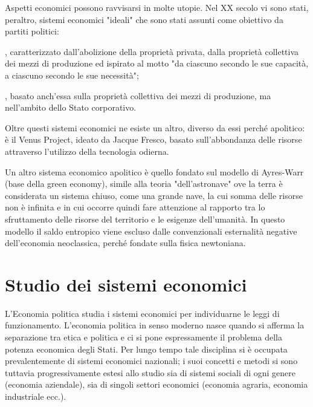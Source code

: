 Aspetti economici possono ravvisarsi in molte utopie. Nel XX secolo 
vi sono stati, peraltro, sistemi economici "ideali" che sono stati assunti come 
obiettivo da partiti politici:
\begin{description} [noitemsep]
\item [il comunismo], caratterizzato dall'abolizione della proprietà privata, 
dalla proprietà collettiva dei mezzi di produzione ed ispirato al motto "da 
ciascuno secondo le sue capacità, a ciascuno secondo le sue necessità";
\item [il fascismo], basato anch'essa sulla proprietà collettiva dei mezzi di 
produzione, ma nell'ambito dello Stato corporativo.
\end{description}

Oltre questi sistemi economici ne esiste un altro, diverso da essi perché 
apolitico: è il Venus Project, ideato da Jacque 
Fresco, basato sull'abbondanza delle risorse attraverso l'utilizzo della 
tecnologia odierna.

Un altro sistema economico apolitico è quello fondato sul modello di 
Ayres-Warr (base della green economy), simile alla teoria 
"dell'astronave" ove la terra è considerata un sistema chiuso, come una 
grande nave, la cui somma delle risorse non è infinita e in cui occorre quindi 
fare attenzione al rapporto tra lo sfruttamento delle risorse del territorio e 
le esigenze dell'umanità. In questo modello il saldo 
entropico viene escluso dalle convenzionali esternalità negative 
dell'economia neoclassica, perché fondate sulla fisica newtoniana.

\section{Studio dei sistemi economici}


L'Economia politica studia i sistemi economici per individuarne le leggi di 
funzionamento. L'economia politica in senso moderno nasce quando si afferma 
la separazione tra etica e politica e ci si pone espressamente il problema 
della potenza economica degli Stati. Per lungo tempo tale disciplina 
si è occupata prevalentemente di sistemi economici nazionali;
i suoi concetti e metodi si sono tuttavia 
progressivamente estesi allo studio sia di sistemi sociali di ogni genere 
(economia aziendale), sia di singoli settori economici (economia 
agraria, economia industriale ecc.).

